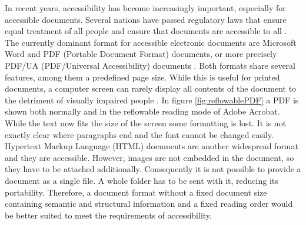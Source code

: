 In recent years, accessibility has become increasingly important, especially for accessible documents. Several nations have passed regulatory laws that ensure equal treatment of all people and ensure that documents are accessible to all \cite{webaim}.\\
The currently dominant format for accessible electronic documents are Microsoft Word and PDF (Portable Document Format) documents, or more precisely PDF/UA (PDF/Universal Accessibility) documents \cite{pdfua}. Both formats share several features, among them a predefined page size. While this is useful for printed documents, a computer screen can rarely display all contents of the document to the detriment of visually impaired people \cite{EPUBzone}. In figure \ref{fig:reflowablePDF} a PDF is shown both normally and in the reflowable reading mode of Adobe Acrobat. While the text now fits the size of the screen some formatting is lost. It is not exactly clear where paragraphs end and the font cannot be changed easily. Hypertext Markup Language (HTML) documents are another widespread format and they are accessible. However, images are not embedded in the document, so they have to be attached additionally. Consequently it is not possible to provide a document as a single file. A whole folder has to be sent with it, reducing its portability.
Therefore, a document format without a fixed document size containing semantic and structural information and a fixed reading order would be better suited to meet the requirements of accessibility.


